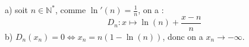 a) soit $n\in\mathbb{N}^*$, comme $\ln'(n)=\frac{1}{n}$, on a :
\[
D_n: x \mapsto \ln(n) + \frac{x-n}{n}
\]
b) $ D_n(x_n) = 0 \Leftrightarrow x_n=n(1-\ln(n))$, donc on a $x_n\to -\infty$.
